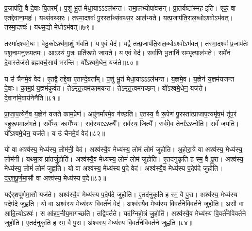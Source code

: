प्र॒जाप॑तिं॒ वै दे॒वाः पि॒तरम्᳚।
प॒शुं भू॒तं मेधा॒याऽऽऽल॑भन्त।
तमा॒लभ्योपा॑वसन्।
प्रा॒तर्यष्टा᳚स्मह॒ इति॑।
एकं॒ वा ए॒तद्दे॒वाना॒महः॑।
यथ्सं॑वथ्स॒रः।
तस्मा॒दश्वः॑ पु॒रस्ता᳚थ्संवथ्स॒र आल॑भ्यते।
यत्प्र॒जाप॑ति॒राल॒ब्धो\-ऽश्वो\-ऽभ॑वत्।
तस्मा॒दश्वः॑।
यथ्स॒द्यो मेधो\-ऽभ॑वत्॥७९॥

तस्मा॑दश्वमे॒धः।
वेदु॒को\-ऽश्व॑मा॒शुं भ॑वति।
य ए॒वं वेद॑।
यद्वै तत्प्र॒जाप॑ति॒राल॒ब्धो\-ऽश्वो\-ऽभ॑वत्।
तस्मा॒दश्वः॑ प्र॒जाप॑तेः पशू॒नामनु॑रूपतमः।
आऽस्य॑ पु॒त्रः प्रति॑\-रूपो जायते।
य ए॒वं वेद॑।
सर्वा॑णि भू॒तानि॑ स॒म्भृत्याल॑भते।
समे॑नं दे॒वास्तेज॑से ब्रह्मवर्च॒साय॑ भरन्ति।
यो᳚ऽश्वमे॒धेन॒ यज॑ते॥८०॥

य उ॑ चैनमे॒वं वेद॑।
ए॒तद्वै तद्दे॒वा ए॒तान्दे॒वता᳚म्।
प॒शुं भू॒तं मेधा॒याऽऽऽल॑भन्त।
य॒ज्ञमे॒व।
य॒ज्ञेन॑ य॒ज्ञम॑यजन्त दे॒वाः।
का॒म॒प्रं य॒ज्ञम॑कुर्वत।
ते॑ऽमृत॒त्वम॑कामयन्त।
ते॑ऽमृत॒त्वम॑गच्छन्।
यो᳚ऽश्वमे॒धेन॒ यज॑ते।
दे॒वाना॑मे॒वाय॑नेनैति॥८१॥

प्रा॒जा॒प॒त्येनै॒व य॒ज्ञेन॑ यजते काम॒प्रेण॑।
अपु॑नर्मारमे॒व ग॑च्छति।
ए॒तस्य॒ वै रू॒पेण॑ पु॒रस्ता᳚त्प्राजाप॒त्यमृ॑ष॒भं तू॑प॒रं ब॑हुरू॒पमाल॑भते।
सर्वे᳚भ्यः॒ कामे᳚भ्यः।
सर्व॒स्याऽऽप्त्यै᳚।
सर्व॑स्य॒ जित्यै᳚।
सर्व॑मे॒व तेना᳚ऽऽप्नोति।
सर्वं॑ जयति।
यो᳚ऽश्वमे॒धेन॒ यज॑ते।
य उ॑ चैनमे॒वं वेद॑॥८२॥\anuvakamend[मेधो\-ऽभ॑व॒द्यज॑त एति॒ वेद॑]

यो वा अश्व॑स्य॒ मेध्य॑स्य॒ लोम॑नी॒ वेद॑।
अश्व॑स्यै॒व मेध्य॑स्य॒ लोमं॑ लोमं जुहोति।
अ॒हो॒रा॒त्रे वा अश्व॑स्य॒ मेध्य॑स्य॒ लोम॑नी।
यथ्सा॒यं प्रा॑तर्जु॒होति॑।
अश्व॑स्यै॒व मेध्य॑स्य॒ लोमं॑ लोमं जुहोति।
ए॒तद॑नुकृति ह स्म॒ वै पु॒रा।
अश्व॑स्य॒ मेध्य॑स्य॒ लोमं॑ लोमं जुह्वति।
यो वा अश्व॑स्य॒ मेध्य॑स्य प॒दे वेद॑।
अश्व॑स्यै॒व मेध्य॑स्य प॒देप॑दे जुहोति।
द॒र्॒श॒पू॒र्ण॒मा॒सौ वा अश्व॑स्य॒ मेध्य॑स्य प॒दे॥८३॥

यद्द॑र्‌\mbox{}शपूर्णमा॒सौ यज॑ते।
अश्व॑स्यै॒व मेध्य॑स्य प॒देप॑दे जुहोति।
ए॒तद॑नुकृति ह स्म॒ वै पु॒रा।
अश्व॑स्य॒ मेध्य॑स्य प॒देप॑दे जुह्वति।
यो वा अश्व॑स्य॒ मेध्य॑स्य वि॒वर्त॑नं॒ वेद॑।
अश्व॑स्यै॒व मेध्य॑स्य वि॒वर्त॑नेविवर्तने जुहोति।
अ॒सौ वा आ॑दि॒त्यो\-ऽश्वः॑।
स आ॑हव॒नीय॒माग॑च्छति।
तद्विव॑र्तते।
यद॑ग्निहो॒त्रं जु॒होति॑।
अश्व॑स्यै॒व मेध्य॑स्य वि॒वर्त॑नेविवर्तने जुहोति।
ए॒तद॑नुकृति ह स्म॒ वै पु॒रा।
अ॑श्वस्य॒ मेध्य॑स्य वि॒वर्त॑नेविवर्तने जुह्वति॥८४॥\anuvakamend[प॒दे अ॑ग्निहो॒त्रं जु॒होति॒ त्रीणि॑ च]

